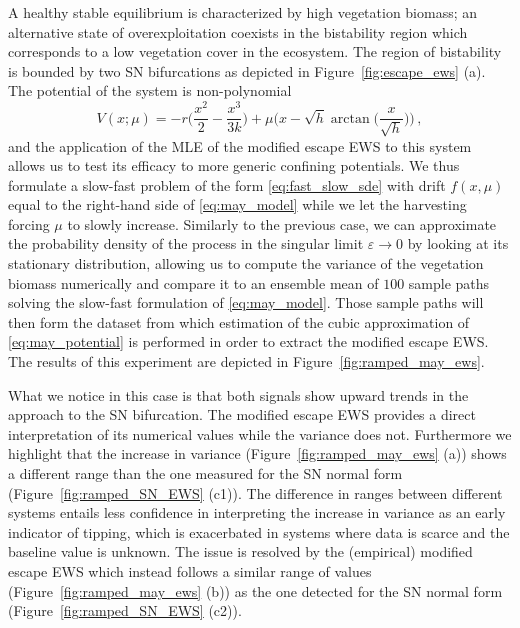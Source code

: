 \documentclass[10pt]{article}
\newcommand{\fref}[1]{Figure~\ref{#1}}
\begin{document}
A healthy stable equilibrium is characterized by high vegetation biomass; an alternative state of overexploitation coexists in the bistability region which corresponds to a low vegetation cover in the ecosystem.
The region of bistability is bounded by two SN bifurcations as depicted in \fref{fig:escape_ews} (a).
The potential of the system is non-polynomial
%
\begin{equation}\label{eq:may_potential}
        V(x;\mu) = -r\bigg(\frac{x^2}{2} - \frac{x^3}{3k}\bigg) + \mu\bigg(x - \sqrt{h}\arctan\bigg(\frac{x}{\sqrt{h}}\bigg)\bigg)\,,
\end{equation}
%
and the application of the MLE of the modified escape EWS to this system allows us to test its efficacy to more generic confining potentials.
We thus formulate a slow-fast problem of the form \eqref{eq:fast_slow_sde} with drift $f(x,\mu)$ equal to the right-hand side of \eqref{eq:may_model} while we let the harvesting forcing $\mu$ to slowly increase.
Similarly to the previous case, we can approximate the probability density of the process in the singular limit $\varepsilon\to0$ by looking at its stationary distribution, allowing us to compute the variance of the vegetation biomass numerically and compare it to an ensemble mean of $100$ sample paths solving the slow-fast formulation of \eqref{eq:may_model}.
Those sample paths will then form the dataset from which estimation of the cubic approximation of \eqref{eq:may_potential} is performed in order to extract the modified escape EWS.
The results of this experiment are depicted in \fref{fig:ramped_may_ews}.

What we notice in this case is that both signals show upward trends in the approach to the SN bifurcation.
The modified escape EWS provides a direct interpretation of its numerical values while the variance does not.
Furthermore we highlight that the increase in variance (\fref{fig:ramped_may_ews} (a)) shows a different range than the one measured for the SN normal form (\fref{fig:ramped_SN_EWS} (c1)).
The difference in ranges between different systems entails less confidence in interpreting the increase in variance as an early indicator of tipping, which is exacerbated in systems where data is scarce and the baseline value is unknown.
The issue is resolved by the (empirical) modified escape EWS which instead follows a similar range of values (\fref{fig:ramped_may_ews} (b)) as the one detected for the SN normal form (\fref{fig:ramped_SN_EWS} (c2)).
%
\end{document}
